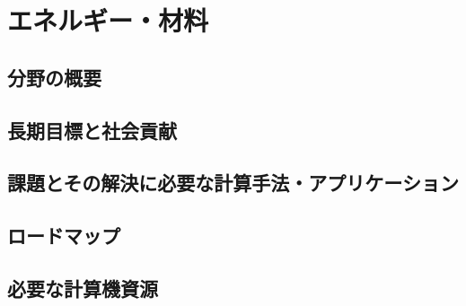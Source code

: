 \section{エネルギー・材料}
\label{sec:エネルギー材料}

\subsection{分野の概要}

\subsection{長期目標と社会貢献}

\subsection{課題とその解決に必要な計算手法・アプリケーション}

\subsection{ロードマップ}

\subsection{必要な計算機資源}


\nocite{*}


